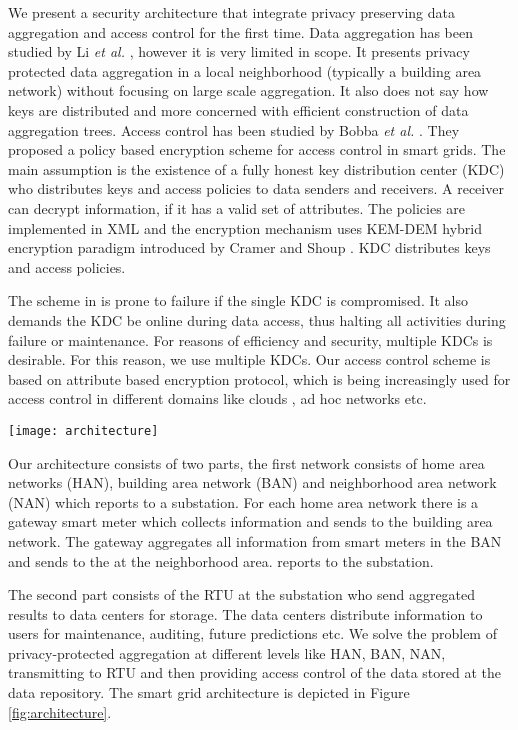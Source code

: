 \documentclass[conference]{IEEEtran}[10pt]
\begin{document}
We present a security architecture that integrate privacy preserving data aggregation and access control for the first time. 
Data aggregation has been studied by Li \emph{et al.} \cite{LLL10}, however it is very limited in scope. 
It presents privacy protected data aggregation in a local neighborhood (typically a building area network) without focusing 
on large scale aggregation. 
It also does not say how keys are distributed and more concerned with efficient construction of data aggregation trees. 
Access control has been studied by Bobba \emph{et al.} \cite{BKAA09}. 
They proposed a policy based encryption scheme for access control in smart grids.
The main assumption is the existence of a fully honest key distribution center (KDC) who distributes keys and access policies to 
data senders and receivers. 
A receiver can decrypt information, if it has a valid set of attributes. 
The policies are implemented in XML and the encryption mechanism uses KEM-DEM hybrid encryption paradigm introduced by Cramer and Shoup \cite{CS04}. 
KDC distributes keys and access policies.

The scheme in \cite{BKAA09} is prone to failure if the single KDC is compromised. 
It also demands the KDC be online during data access, thus halting all activities during failure or maintenance. 
For reasons of efficiency and security, multiple KDCs is desirable. 
For this reason, we use multiple KDCs. Our access control scheme is based on
attribute based encryption protocol, which is being increasingly used for access control in different domains like clouds \cite{RNS11c}, 
ad hoc networks \cite{RNS11} etc. 

\begin{figure*}[htb]
\begin{centering}
\texttt{[image: architecture]}
\caption{
Aggregation and access control architecture
}
\label{fig:architecture}
\end{centering}
\end{figure*}


Our architecture consists of two parts, the first network consists of home area networks (HAN), building area network (BAN) and neighborhood
area network (NAN) which reports to a substation. 
For each home area network there is a gateway smart meter  which collects information and sends to  
the building area network. The gateway  aggregates all information from smart meters in the BAN and sends to the
 at the neighborhood area. 
 reports to the substation. 
		
The second part consists of the RTU at the substation
who send aggregated results to data centers for storage. 
The data centers distribute information to users for maintenance, auditing, future predictions etc. 
We solve the problem of privacy-protected aggregation at different levels like HAN, BAN, NAN, transmitting to  RTU and
then providing access control of the data stored at the data repository. 
The smart grid architecture is depicted in Figure \ref{fig:architecture}. 
\end{document}
